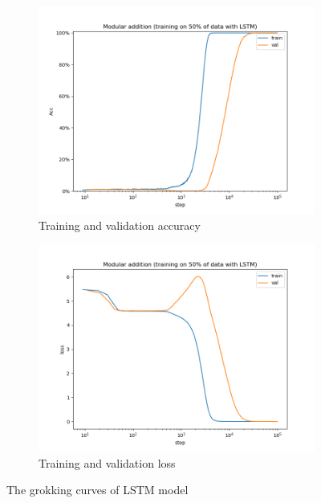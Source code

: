 \begin{figure}[!ht]
    \centering
    \begin{subfigure}{0.45\textwidth}
        \centering
        \includegraphics[width=\linewidth]{fig/grokking_curves/addition_50_LSTM_step.png}
        \caption{Training and validation accuracy}
        \label{fig:grokking_curve_LSTM}
    \end{subfigure}
    \begin{subfigure}{0.45\textwidth}
        \centering
        \includegraphics[width=\linewidth]{fig/loss_curves/addition_50_LSTM_step.png}
        \caption{Training and validation loss}
        \label{fig:loss_curve_LSTM}
    \end{subfigure}

    \caption{The grokking curves of LSTM model}
    \label{fig:acc_and_loss_LSTM}
\end{figure}

